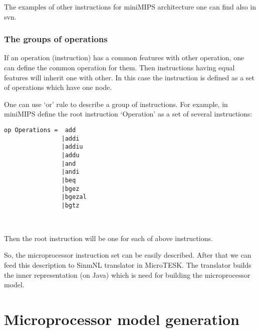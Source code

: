 \documentclass[oneside,final,12pt]{extreport}
\begin{document}
The examples of other instructions for miniMIPS architecture one can find also in svn.

\bigskip



\bigskip



\subsubsection*{The groups of operations}


\bigskip

If an operation (instruction) has a common features with other operation, one can define the common operation for them. Then instructions having equal features will inherit one with other. In this case the instruction is defined as a set of operations which have one node.

One can use ‘or’ rule to describe a group of instructions. For example, in miniMIPS define the root instruction ‘Operation’ as a set of several instructions:

\bigskip

\begin{verbatim}
op Operations =  add   
                |addi  
                |addiu 
                |addu  
                |and   
                |andi  
                |beq   
                |bgez  
                |bgezal
                |bgtz
                
            
\end{verbatim}

\bigskip

Then the root instruction will be one for each of above instructions.

\bigskip

So, the microprocessor instruction set can be easily described. After that we can feed this description to SinmNL translator in MicroTESK. The translator builds the inner representation (on Java) which is need for building the microprocessor model.

\bigskip

\newpage

\section*{Microprocessor model generation}
\end{document}
